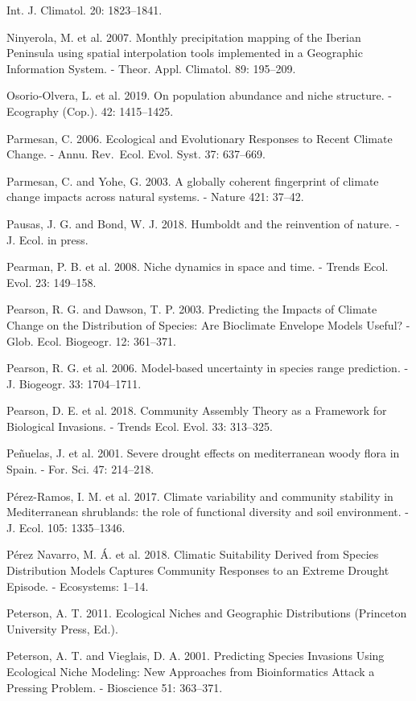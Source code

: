 \documentclass[11pt,twoside]{reedthesis}
\begin{document}
Int. J. Climatol. 20: 1823--1841.\par
Ninyerola, M. et al. 2007. Monthly precipitation mapping of the Iberian
Peninsula using spatial interpolation tools implemented in a Geographic
Information System. - Theor. Appl. Climatol. 89: 195--209.\par
Osorio‐Olvera, L. et al. 2019. On population abundance and niche
structure. - Ecography (Cop.). 42: 1415--1425.\par
Parmesan, C. 2006. Ecological and Evolutionary Responses to Recent
Climate Change. - Annu. Rev.~Ecol. Evol. Syst. 37: 637--669.\par
Parmesan, C. and Yohe, G. 2003. A globally coherent fingerprint of
climate change impacts across natural systems. - Nature 421: 37--42.\par
Pausas, J. G. and Bond, W. J. 2018. Humboldt and the reinvention of
nature. - J. Ecol. in press.\par
Pearman, P. B. et al. 2008. Niche dynamics in space and time. - Trends
Ecol. Evol. 23: 149--158.\par
Pearson, R. G. and Dawson, T. P. 2003. Predicting the Impacts of Climate
Change on the Distribution of Species: Are Bioclimate Envelope Models
Useful? - Glob. Ecol. Biogeogr. 12: 361--371.\par
Pearson, R. G. et al. 2006. Model-based uncertainty in species range
prediction. - J. Biogeogr. 33: 1704--1711.\par
Pearson, D. E. et al. 2018. Community Assembly Theory as a Framework for
Biological Invasions. - Trends Ecol. Evol. 33: 313--325.\par
Peñuelas, J. et al. 2001. Severe drought effects on mediterranean woody
flora in Spain. - For. Sci. 47: 214--218.\par
Pérez-Ramos, I. M. et al. 2017. Climate variability and community
stability in Mediterranean shrublands: the role of functional diversity
and soil environment. - J. Ecol. 105: 1335--1346.\par
Pérez Navarro, M. Á. et al. 2018. Climatic Suitability Derived from
Species Distribution Models Captures Community Responses to an Extreme
Drought Episode. - Ecosystems: 1--14.\par
Peterson, A. T. 2011. Ecological Niches and Geographic Distributions
(Princeton University Press, Ed.).\par
Peterson, A. T. and Vieglais, D. A. 2001. Predicting Species Invasions
Using Ecological Niche Modeling: New Approaches from Bioinformatics
Attack a Pressing Problem. - Bioscience 51: 363--371.\par
\end{document}
